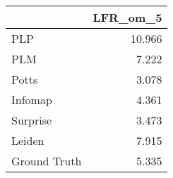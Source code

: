 \begin{tabular}{lr}
\toprule
{} & LFR_om_5 \\
\midrule
PLP          &   10.966 \\
PLM          &    7.222 \\
Potts        &    3.078 \\
Infomap      &    4.361 \\
Surprise     &    3.473 \\
Leiden       &    7.915 \\
Ground Truth &    5.335 \\
\bottomrule
\end{tabular}
